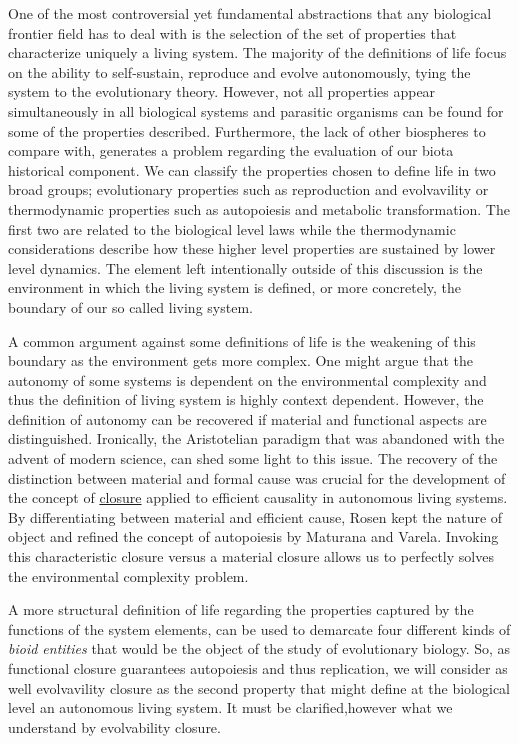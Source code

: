\documentclass[aps,twocolumn]{revtex4-1}
\begin{document}
One of the most controversial yet fundamental abstractions that any biological frontier field has to deal with is the selection of the set of properties that characterize uniquely a living system. The majority of the definitions of life focus on the ability to self-sustain, reproduce and evolve autonomously, tying the system to the evolutionary theory. However, not all properties appear simultaneously in all biological systems and parasitic organisms can be found for some of the properties described. Furthermore, the lack of other biospheres to compare with, generates a problem regarding the evaluation of our biota historical component. We can classify the properties chosen to define life in two broad groups; evolutionary properties such as reproduction and evolvavility or thermodynamic properties such as autopoiesis and metabolic transformation. The first two are related to the biological level laws while the thermodynamic considerations describe how these higher level properties are sustained by lower level dynamics. The element left intentionally outside of this discussion is the environment in which the living system is defined, or more concretely, the boundary of our so called living system. 

A common argument against some definitions of life is the weakening of this boundary as the environment gets more complex. One might argue that the autonomy of some systems is dependent on the environmental complexity and thus the definition of living system is highly context dependent. However, the definition of autonomy can be recovered if material and functional aspects are distinguished. Ironically, the Aristotelian paradigm that was abandoned with the advent of modern science, can shed some light to this issue. The recovery of the distinction between material and formal cause was crucial for the development of the concept of \href{http://en.wikipedia.org/wiki/Closure_(mathematics)}{closure} applied to efficient causality in autonomous living systems. By differentiating between material and efficient cause, Rosen kept the nature of object and refined the concept of autopoiesis by Maturana and Varela. Invoking this characteristic closure versus a material closure allows us to perfectly solves the environmental complexity problem. 

A more structural definition of life regarding the properties captured by the functions of the system elements, can be used to demarcate four different kinds of \textit{bioid entities} that would be the object of the study of evolutionary biology. So, as functional closure guarantees autopoiesis and thus replication, we will consider as well 
evolvavility closure as the second property that might define at the biological level an autonomous living system. It must be clarified,however what we understand by evolvability closure. 
\end{document}
